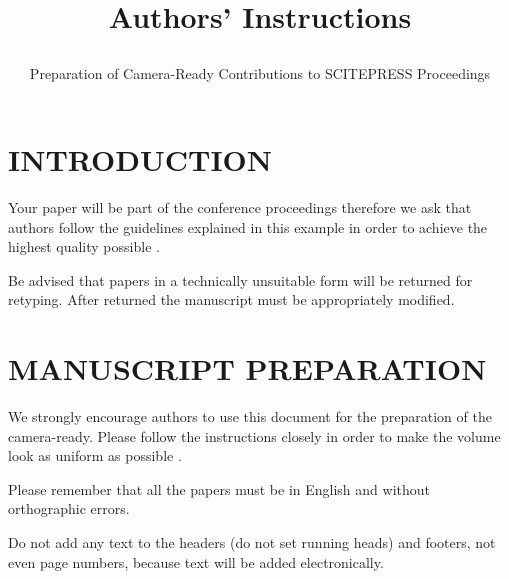 \documentclass[a4paper,twoside]{article}
\begin{document}
\title{Authors' Instructions  \subtitle{Preparation of Camera-Ready Contributions to SCITEPRESS Proceedings} }

\author{
}



\onecolumn \maketitle \normalsize \vfill

\section{\uppercase{Introduction}}
\label{sec:introduction}

\noindent Your paper will be part of the conference proceedings
therefore we ask that authors follow the guidelines explained in
this example in order to achieve the highest quality possible
\cite{Smith98}.

Be advised that papers in a technically unsuitable form will be
returned for retyping. After returned the manuscript must be
appropriately modified.

\section{\uppercase{Manuscript Preparation}}

\noindent We strongly encourage authors to use this document for the
preparation of the camera-ready. Please follow the instructions
closely in order to make the volume look as uniform as possible
\cite{Moore99}.

Please remember that all the papers must be in English and without
orthographic errors.

Do not add any text to the headers (do not set running heads) and
footers, not even page numbers, because text will be added
electronically.
\end{document}
